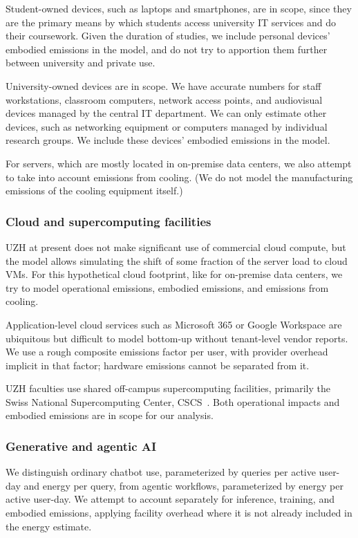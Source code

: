 \documentclass[11pt]{article}
\let\cite\parencite
\begin{document}
Student-owned devices, such as laptops and smartphones, are in scope, since they
are the primary means by which students access university IT services and do
their coursework. Given the duration of studies, we include personal devices'
embodied emissions in the model, and do not try to apportion them further
between university and private use.

University-owned devices are in scope. We have accurate numbers for staff
workstations, classroom computers, network access points, and audiovisual
devices managed by the central IT department. We can only estimate other
devices, such as networking equipment or computers managed by individual
research groups. We include these devices' embodied emissions in the model.

For servers, which are mostly located in on-premise data centers, we also
attempt to take into account emissions from cooling. (We do not model the
manufacturing emissions of the cooling equipment itself.)

\subsubsection*{Cloud and supercomputing facilities}

UZH at present does not make significant use of commercial cloud compute, but
the model allows simulating the shift of some fraction of the server load to
cloud VMs. For this hypothetical cloud footprint, like for on-premise data
centers, we try to model operational emissions, embodied emissions, and
emissions from cooling.

Application-level cloud services such as Microsoft 365 or Google Workspace are
ubiquitous but difficult to model bottom-up without tenant-level vendor reports.
We use a rough composite emissions factor per user, with provider overhead
implicit in that factor; hardware emissions cannot be separated from it.

UZH faculties use shared off-campus supercomputing facilities, primarily the
Swiss National Supercomputing Center, CSCS~\cite{cscs}. Both operational impacts
and embodied emissions are in scope for our analysis.

\subsubsection*{Generative and agentic AI}

We distinguish ordinary chatbot use, parameterized by queries per active
user-day and energy per query, from agentic workflows, parameterized by energy
per active user-day. We attempt to account separately for inference, training,
and embodied emissions, applying facility overhead where it is not already
included in the energy estimate.
\end{document}
